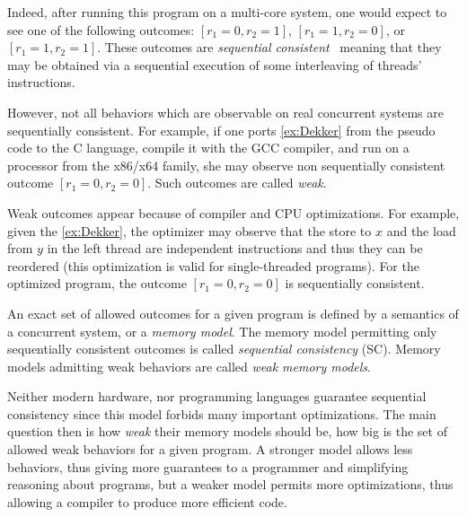 Indeed, after running this program on a multi-core system, one would expect to see 
one of the following outcomes: ${[r_1=0, r_2=1]}$, ${[r_1=1,r_2=0]}$, or ${[r_1=1,r_2=1]}$.
These outcomes are \emph{sequential consistent}~\cite{Lamport:TC79} meaning
that they may be obtained via a sequential execution 
of some interleaving of threads' instructions.



However, not all behaviors which are observable on real concurrent systems are sequentially consistent. 
For example, if one ports \ref{ex:Dekker} 
from the pseudo code to the C language, compile it with the GCC compiler, 
and run on a processor from the x86/x64 family,
she may observe non sequentially consistent outcome $[r_1=0, r_2=0]$.
Such outcomes are called \emph{weak}.

Weak outcomes appear because of compiler and CPU optimizations.
For example, given the \ref{ex:Dekker},
the optimizer may observe that the store to $x$ and the load from $y$ in the left thread
are independent instructions and thus they can be reordered
(this optimization is valid for single-threaded programs).
For the optimized program, the outcome $[r_1=0, r_2=0]$
is sequentially consistent.

An exact set of allowed outcomes for a given program 
is defined by a semantics of a concurrent system, or a \emph{memory model}.
The memory model permitting only sequentially consistent outcomes 
is called \emph{sequential consistency} (SC).
Memory models admitting weak behaviors are called \emph{weak memory models}.

Neither modern hardware, nor programming languages 
guarantee sequential consistency since this model forbids many important optimizations.
The main question then is how \emph{weak} their memory models should be,
\ie how big is the set of allowed weak behaviors for a given program.
A stronger model allows less behaviors, thus giving more guarantees to a programmer
and simplifying reasoning about programs, but a weaker model permits more optimizations,
thus allowing a compiler to produce more efficient code.

